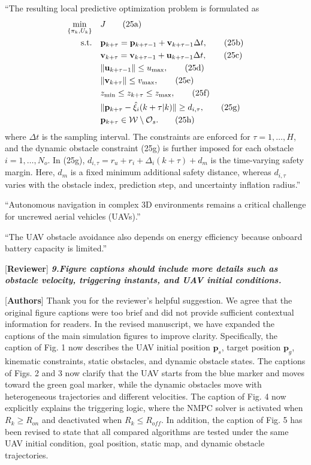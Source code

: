 \documentclass[12pt, twosides]{article}
\newcommand{\vect}[1]{\mathbf{#1}}
\theoremstyle{definition}
\begin{document}
``The resulting local predictive optimization problem is formulated as
\begin{subequations}
	\label{eq:opt_problem_rev}
	\renewcommand{\theequation}{25\alph{equation}}
	\begin{align}
		\min_{\{\pi_k, U_k\}} \quad & J \tag{25a} \\
		\text{s.t.} \quad & \vect{p}_{k+\tau} = \vect{p}_{k+\tau-1} + \vect{v}_{k+\tau-1}\Delta t, \tag{25b} \\
		& \vect{v}_{k+\tau} = \vect{v}_{k+\tau-1} + \vect{u}_{k+\tau-1}\Delta t, \tag{25c} \\
		& \|\vect{u}_{k+\tau-1}\| \le u_{\max}, \tag{25d} \\
		& \|\vect{v}_{k+\tau}\| \le v_{\max}, \tag{25e} \\
		& z_{\min} \le z_{k+\tau} \le z_{\max}, \tag{25f} \\
		& \|\vect{p}_{k+\tau} - \hat{\vect{\xi}}_{i}(k+\tau|k)\| \ge d_{i,\tau}, \tag{25g} \\
		& \vect{p}_{k+\tau} \in \mathcal{W} \setminus \mathcal{O}_s. \tag{25h}
	\end{align}
\end{subequations}
where $\Delta t$ is the sampling interval. The constraints are enforced for $\tau=1,\dots,H$, and the dynamic obstacle constraint (25g) is further imposed for each obstacle $i=1,\dots,N_o$. In (25g), $d_{i,\tau}=r_u+r_i+\Delta_i(k+\tau)+d_m$ is the time-varying safety margin. Here, $d_m$ is a fixed minimum additional safety distance, whereas $d_{i,\tau}$ varies with the obstacle index, prediction step, and uncertainty inflation radius.''

``Autonomous navigation in complex 3D environments remains a critical challenge for uncrewed aerial vehicles (UAVs).''

``The UAV obstacle avoidance also depends on energy efficiency because onboard battery capacity is limited.''

\textcolor[rgb]{0.00,0.00,1.00}{[\textbf {Reviewer}]} \textit{\textbf{9.Figure captions should include more details such as obstacle velocity, triggering instants, and UAV initial conditions.}}

\textcolor[rgb]{0.00,0.00,1.00}{[\textbf{Authors}]} Thank you for the reviewer's helpful suggestion. We agree that the original figure captions were too brief and did not provide sufficient contextual information for readers. In the revised manuscript, we have expanded the captions of the main simulation figures to improve clarity. Specifically, the caption of Fig. 1 now describes the UAV initial position $\vect{p}_s$, target position $\vect{p}_g$, kinematic constraints, static obstacles, and dynamic obstacle states. The captions of Figs. 2 and 3 now clarify that the UAV starts from the blue marker and moves toward the green goal marker, while the dynamic obstacles move with heterogeneous trajectories and different velocities. The caption of Fig. 4 now explicitly explains the triggering logic, where the NMPC solver is activated when $R_k \ge R_{on}$ and deactivated when $R_k \le R_{off}$. In addition, the caption of Fig. 5 has been revised to state that all compared algorithms are tested under the same UAV initial condition, goal position, static map, and dynamic obstacle trajectories.
\end{document}
